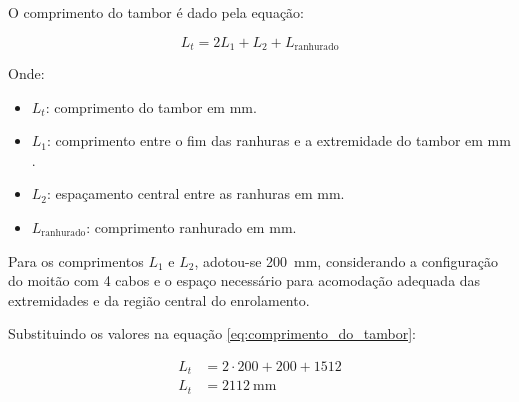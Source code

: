 O comprimento do tambor é dado pela equação:

\begin{equation}
  L_t = 2L_1 + L_2 + L_{\text{ranhurado}}
  \label{eq:comprimento_do_tambor}
\end{equation}

Onde:

\begin{itemize}[leftmargin=1.25cm]
  \item $L_t$: comprimento do tambor em $\si{\milli\meter}$.
  \item $L_1$: comprimento entre o fim das ranhuras e a extremidade do tambor em $\si{\milli\meter}$.
  \item $L_2$: espaçamento central entre as ranhuras em $\si{\milli\meter}$.
  \item $L_{\text{ranhurado}}$: comprimento ranhurado em $\si{\milli\meter}$.
\end{itemize}

\vspace{1em}

Para os comprimentos $L_1$ e $L_2$, adotou-se \SI{200}{\milli\meter}, considerando a configuração do moitão com 4 cabos e o espaço necessário para acomodação adequada das extremidades e da região central do enrolamento.

Substituindo os valores na equação \eqref{eq:comprimento_do_tambor}:

\begin{align*}
  L_t & = 2 \cdot 200 + 200 + 1512        \\
  L_t & = \boxed{\SI{2112}{\milli\meter}}
\end{align*}
